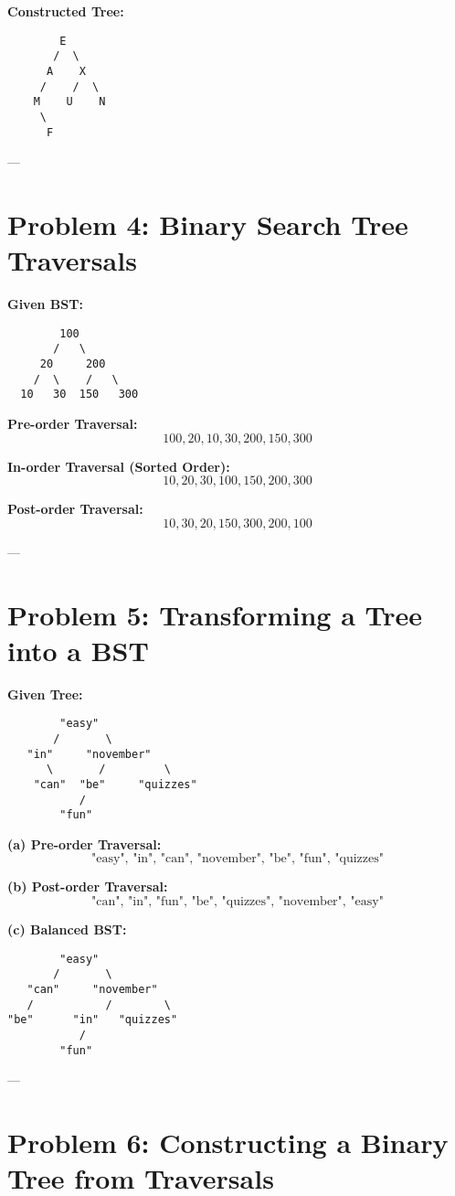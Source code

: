 \documentclass{article}
\begin{document}
\textbf{Constructed Tree:}
\begin{verbatim}
        E
       /  \
      A    X
     /    /  \
    M    U    N
     \
      F
\end{verbatim}

---

\section{Problem 4: Binary Search Tree Traversals}

\textbf{Given BST:}
\begin{verbatim}
        100
       /   \
     20     200
    /  \    /   \
  10   30  150   300
\end{verbatim}

\textbf{Pre-order Traversal:}  
\[
100, 20, 10, 30, 200, 150, 300
\]

\textbf{In-order Traversal (Sorted Order):}  
\[
10, 20, 30, 100, 150, 200, 300
\]

\textbf{Post-order Traversal:}  
\[
10, 30, 20, 150, 300, 200, 100
\]

---

\section{Problem 5: Transforming a Tree into a BST}

\textbf{Given Tree:}
\begin{verbatim}
        "easy"
       /       \
   "in"     "november"
      \       /         \
    "can"  "be"     "quizzes"
           /
        "fun"
\end{verbatim}

\textbf{(a) Pre-order Traversal:}  
\[
\text{"easy", "in", "can", "november", "be", "fun", "quizzes"}
\]

\textbf{(b) Post-order Traversal:}  
\[
\text{"can", "in", "fun", "be", "quizzes", "november", "easy"}
\]

\textbf{(c) Balanced BST:}
\begin{verbatim}
        "easy"
       /       \
   "can"     "november"
   /           /        \
"be"      "in"   "quizzes"
           /
        "fun"
\end{verbatim}

---

\section{Problem 6: Constructing a Binary Tree from Traversals}
\end{document}
